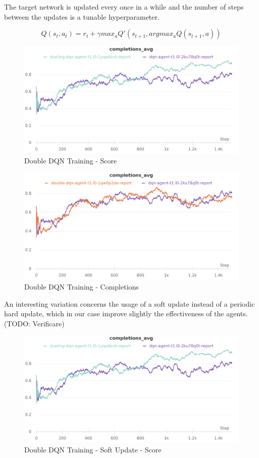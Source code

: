 \documentclass[12pt]{article}
\begin{document}
The target network is updated every once in a while and the number of steps between the updates is a tunable hyperparameter.

\[ Q(s_t,a_t)= r_t+\gamma max_a Q'(s_{t+1},argmax_a Q(s_{t+1},a))\]

\begin{figure}[H]
        \centerline{\includegraphics[scale=.2]{res/charts/double_scores.png}}
        \caption{Double DQN Training - Score}
\end{figure}

\begin{figure}[H]
        \centerline{\includegraphics[scale=.2]{res/charts/double_completions.png}}
        \caption{Double DQN Training - Completions}
\end{figure}

An interesting variation concerns the usage of a soft update instead of a periodic hard update, which in our case improve slightly the effectiveness of the agents. (TODO: Verificare)

\begin{figure}[H]
        \centerline{\includegraphics[scale=.2]{res/charts/double_scores.png}}
        \caption{Double DQN Training - Soft Update - Score}
\end{figure}
\end{document}
